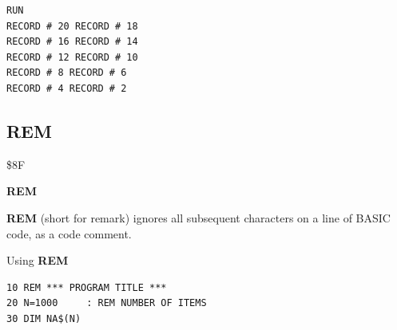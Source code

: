 \begin{description}[leftmargin=2cm,style=nextline]
\begin{tcolorbox}[colback=black,coltext=white]
\begin{verbatim}
RUN
RECORD # 20 RECORD # 18
RECORD # 16 RECORD # 14
RECORD # 12 RECORD # 10
RECORD # 8 RECORD # 6
RECORD # 4 RECORD # 2
\end{verbatim}
\end{tcolorbox}
\end{description}


\newpage
\subsection{REM}
\begin{description}[leftmargin=2cm,style=nextline]
\item [Token:]    \$8F

\item [Format:]   {\bf REM}

\item [Usage:]    {\bf REM} (short for remark) ignores all subsequent characters on a line of BASIC code, as a code comment.

\item [Example:]  Using {\bf REM}

\begin{tcolorbox}[colback=black,coltext=white]
\verbatimfont{\codefont}
\begin{verbatim}
10 REM *** PROGRAM TITLE ***
20 N=1000     : REM NUMBER OF ITEMS
30 DIM NA$(N)
\end{verbatim}
\end{tcolorbox}
\end{description}


\newpage
